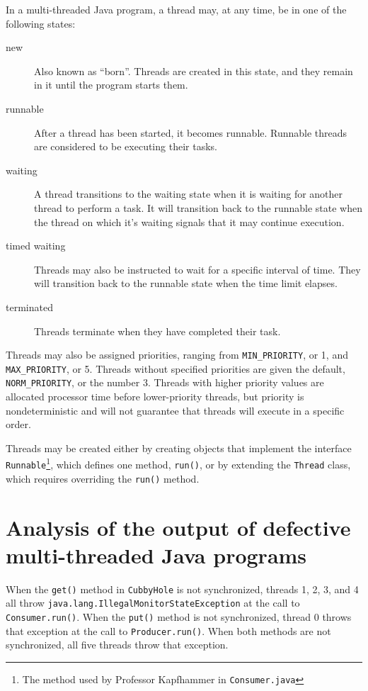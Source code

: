 \documentclass[12pt,a4paper]{article}
\begin{document}
	In a multi-threaded Java program, a thread may, at any time, be in one of the following states:
	\begin{description}
		\item[new]{Also known as ``born''. Threads are created in this state, and they remain in it until the program starts them.}
		\item[runnable]{After a thread has been started, it becomes runnable. Runnable threads are considered to be executing their tasks.}
		\item[waiting]{A thread transitions to the waiting state when it is waiting for another thread to perform a task. It will transition back to the runnable state when the thread on which it's waiting signals that it may continue execution.}
		\item[timed waiting]{Threads may also be instructed to wait for a specific interval of time. They will transition back to the runnable state when the time limit elapses.}
		\item[terminated]{Threads terminate when they have completed their task.}
	\end{description}

	Threads may also be assigned priorities, ranging from \texttt{MIN\_PRIORITY}, or 1, and \allowbreak\texttt{MAX\_PRIORITY}, or 5. Threads without specified priorities are given the default, \allowbreak\texttt{NORM\_PRIORITY}, or the number 3. Threads with higher priority values are allocated processor time before lower-priority threads, but priority is nondeterministic and will not guarantee that threads will execute in a specific order. 

	Threads may be created either by creating objects that implement the interface \texttt{Runnable}\footnote{The method used by Professor Kapfhammer in \texttt{Consumer.java}}, which defines one method, \texttt{run()}, or by extending the \texttt{Thread} class, which requires overriding the \texttt{run()} method. 

  \section{Analysis of the output of defective multi-threaded Java programs}

	When the \texttt{get()} method in \texttt{CubbyHole} is not synchronized, threads 1, 2, 3, and 4 all throw \allowbreak\texttt{java.lang.IllegalMonitorStateException} at the call to \texttt{Consumer.run()}. When the \texttt{put()} method is not synchronized, thread 0 throws that exception at the call to \texttt{Producer.run()}. When both methods are not synchronized, all five threads throw that exception.
\end{document}
